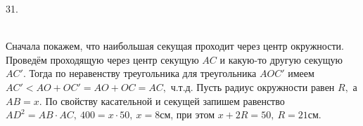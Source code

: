 31. \begin{figure}[ht!]
\end{figure}\\
Сначала покажем, что наибольшая секущая проходит через центр окружности. Проведём проходящую через центр секущую $AC$ и какую-то другую секущую $AC'.$ Тогда по неравенству треугольника для треугольника $AOC'$ имеем $AC'<AO+OC'=AO+OC=AC,$ ч.т.д. Пусть радиус окружности равен $R,$ а $AB=x.$ По свойству касательной и секущей
запишем равенство $AD^2=AB\cdot AC,\ 400=x\cdot 50,\ x=8$см, при этом $x+2R=50,\ R=21$см.\\
